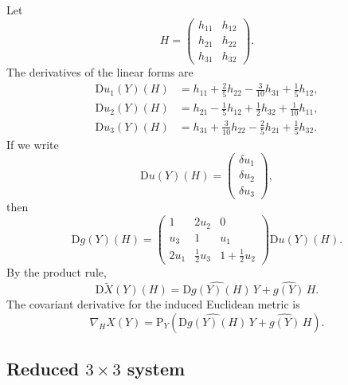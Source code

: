 \documentclass[11pt]{article}
\newcommand{\D}{\mathrm{D}}
\newcommand{\Proj}{\mathrm{P}}
\begin{document}
Let
\[
    H=
    \begin{pmatrix}
        h_{11}&h_{12}\\
        h_{21}&h_{22}\\
        h_{31}&h_{32}
    \end{pmatrix}.
\]
The derivatives of the linear forms are
\begin{align*}
    \D u_1(Y)(H)
    &=
    h_{11}
    +\frac25h_{22}
    -\frac3{10}h_{31}
    +\frac15h_{12},\\
    \D u_2(Y)(H)
    &=
    h_{21}
    -\frac15h_{12}
    +\frac12h_{32}
    +\frac1{10}h_{11},\\
    \D u_3(Y)(H)
    &=
    h_{31}
    +\frac3{10}h_{22}
    -\frac25h_{21}
    +\frac15h_{32}.
\end{align*}
If we write
\[
    \D u(Y)(H)
    =
    \begin{pmatrix}
        \delta u_1\\
        \delta u_2\\
        \delta u_3
    \end{pmatrix},
\]
then
\begin{equation}\label{eq:Dg_stiefel}
    \D g(Y)(H)
    =
    \begin{pmatrix}
        1&2u_2&0\\
        u_3&1&u_1\\
        2u_1&\frac12u_3&1+\frac12u_2
    \end{pmatrix}
    \D u(Y)(H).
\end{equation}
By the product rule,
\begin{equation}\label{eq:ambient_DX_stiefel}
    \D\widetilde X(Y)(H)
    =
    \widehat{\D g(Y)(H)}\,Y
    +
    \widehat{g(Y)}\,H.
\end{equation}
The covariant derivative for the induced Euclidean metric is
\begin{equation}\label{eq:covariant_DX_stiefel}
    \nabla_H X(Y)
    =
    \Proj_Y\left(
        \widehat{\D g(Y)(H)}\,Y
        +
        \widehat{g(Y)}\,H
    \right).
\end{equation}

\subsection*{Reduced $3\times3$ system}
\end{document}
